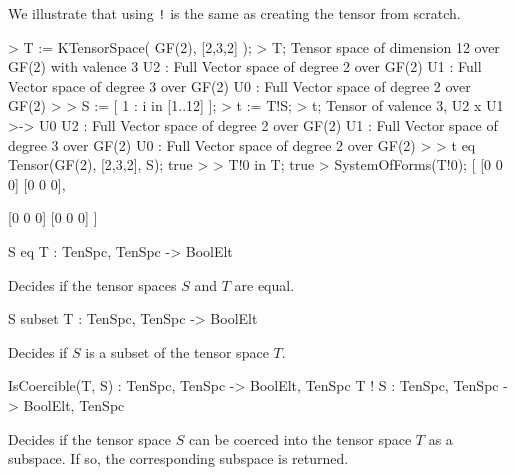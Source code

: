 \begin{example}[Coercion]
We illustrate that using \texttt{!} is the same as creating the tensor from scratch.

\begin{code}
> T := KTensorSpace( GF(2), [2,3,2] );
> T;
Tensor space of dimension 12 over GF(2) with valence 3
U2 : Full Vector space of degree 2 over GF(2)
U1 : Full Vector space of degree 3 over GF(2)
U0 : Full Vector space of degree 2 over GF(2)
> 
> S := [ 1 : i in [1..12] ];
> t := T!S;
> t;
Tensor of valence 3, U2 x U1 >-> U0
U2 : Full Vector space of degree 2 over GF(2)
U1 : Full Vector space of degree 3 over GF(2)
U0 : Full Vector space of degree 2 over GF(2)
> 
> t eq Tensor(GF(2), [2,3,2], S);
true
> 
> T!0 in T;
true
> SystemOfForms(T!0);
[
    [0 0 0]
    [0 0 0],

    [0 0 0]
    [0 0 0]
]
\end{code}

\end{example}

\begin{intrinsics}
S eq T : TenSpc, TenSpc -> BoolElt
\end{intrinsics}

Decides if the tensor spaces $S$ and $T$ are equal.

\begin{intrinsics}
S subset T : TenSpc, TenSpc -> BoolElt
\end{intrinsics}

Decides if $S$ is a subset of the tensor space $T$.

\begin{intrinsics}
IsCoercible(T, S) : TenSpc, TenSpc -> BoolElt, TenSpc
T ! S : TenSpc, TenSpc -> BoolElt, TenSpc
\end{intrinsics}

Decides if the tensor space $S$ can be coerced into the tensor space $T$ as a subspace. If so, the corresponding subspace is returned. 

